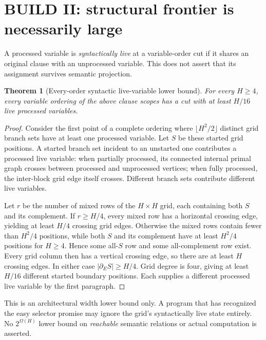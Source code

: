 \documentclass[11pt]{article}
\newtheorem{theorem}{Theorem}
\begin{document}
\section{BUILD II: structural frontier is necessarily large}
A processed variable is \emph{syntactically live} at a variable-order cut if it shares an original clause with an unprocessed variable. This does not assert that its assignment survives semantic projection.
\begin{theorem}[Every-order syntactic live-variable lower bound]
For every $H\ge4$, every variable ordering of the above clause scopes has a cut with at least $H/16$ live processed variables.
\end{theorem}
\begin{proof}
Consider the first point of a complete ordering where $\lfloor H^2/2\rfloor$ distinct grid branch sets have at least one processed variable. Let $S$ be these started grid positions. A started branch set incident to an unstarted one contributes a processed live variable: when partially processed, its connected internal primal graph crosses between processed and unprocessed vertices; when fully processed, the inter-block grid edge itself crosses. Different branch sets contribute different live variables.

Let $r$ be the number of mixed rows of the $H\times H$ grid, each containing both $S$ and its complement. If $r\ge H/4$, every mixed row has a horizontal crossing edge, yielding at least $H/4$ crossing grid edges. Otherwise the mixed rows contain fewer than $H^2/4$ positions, while both $S$ and its complement have at least $H^2/4$ positions for $H\ge4$. Hence some all-$S$ row and some all-complement row exist. Every grid column then has a vertical crossing edge, so there are at least $H$ crossing edges. In either case $|\partial_E S|\ge H/4$. Grid degree is four, giving at least $H/16$ different started boundary positions. Each supplies a different processed live variable by the first paragraph.
\end{proof}

\noindent This is an architectural width lower bound only. A program that has recognized the easy selector promise may ignore the grid's syntactically live state entirely. No $2^{\Omega(H)}$ lower bound on \emph{reachable} semantic relations or actual computation is asserted.
\end{document}
